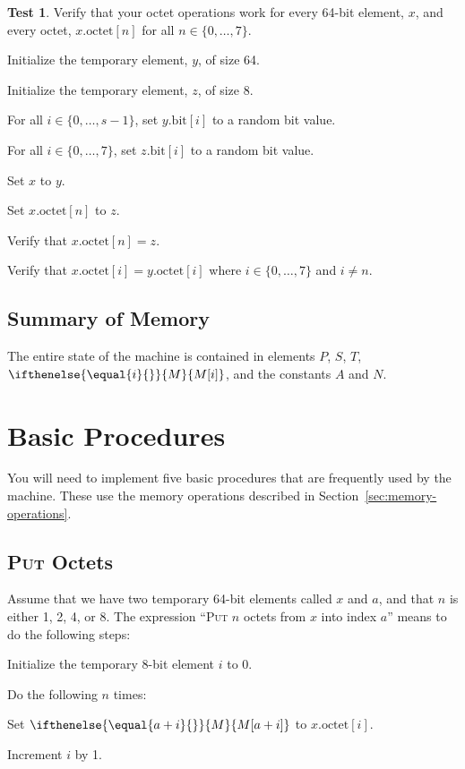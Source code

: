 \documentclass[a4paper,12pt]{article}
\newcommand{\MEM}[1]{\ifthenelse{\equal{#1}{}}{M}{M[#1]}}
\newcommand{\PC}{P}
\newcommand{\SP}{S}
\newcommand{\TERM}{T}
\newcommand{\octno}[2]{#1.\mathrm{octet}[#2]}
\newcommand{\bitno}[2]{#1.\mathrm{bit}[#2]}
\newcommand{\range}[2]{\{#1,\ldots,#2\}}
\newcommand{\proc}[1]{\textsc{#1}}
\theoremstyle{definition}
\newtheorem{test}{Test}
\begin{document}
\begin{test}
  Verify that your octet operations work for every 64-bit element, $x$, and every octet, $\octno{x}{n}$ for all $n \in \range{0}{7}$.
  \begin{stepnumbers}
  \item Initialize the temporary element, $y$, of size 64.
  \item Initialize the temporary element, $z$, of size 8.
  \item For all $i \in \range{0}{s-1}$, set $\bitno{y}{i}$ to a random bit value.
  \item For all $i \in \range{0}{7}$, set $\bitno{z}{i}$ to a random bit value.
  \item Set $x$ to $y$.
  \item Set $\octno{x}{n}$ to $z$.
  \item Verify that $\octno{x}{n} = z$.
  \item Verify that $\octno{x}{i} = \octno{y}{i}$ where $i \in \range{0}{7}$ and $i \neq n$.
  \end{stepnumbers}
\end{test}

\subsection{Summary of Memory}

The entire state of the machine is contained in elements $\PC$, $\SP$, $\TERM$, $\MEM{i}$, and the constants $A$ and $N$.

\section{Basic Procedures}

You will need to implement five basic procedures that are frequently used by the machine.
These use the memory operations described in Section~\ref{sec:memory-operations}.

\subsection{\proc{Put} Octets}

Assume that we have two temporary 64-bit elements called $x$ and $a$, and that $n$ is either 1, 2, 4, or 8.
The expression ``\proc{Put} $n$ octets from $x$ into index $a$'' means to do the following steps:
\begin{stepnumbers}
\item Initialize the temporary 8-bit element $i$ to 0.
\item Do the following $n$ times:
  \begin{stepletters}
  \item Set $\MEM{a+i}$ to $\octno{x}{i}$.
  \item Increment $i$ by 1.
  \end{stepletters}
\end{stepnumbers}
\end{document}
